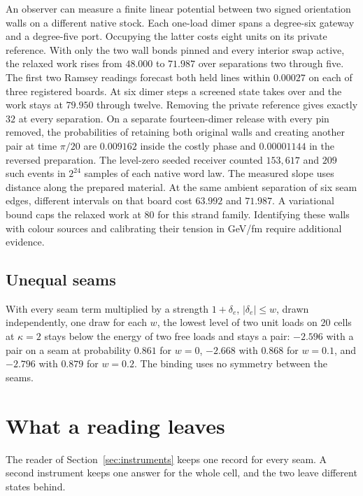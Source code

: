 \documentclass[11pt]{article}
\theoremstyle{definition}
\theoremstyle{remark}
\theoremstyle{plain}
\begin{document}
An observer can measure a finite linear potential between two signed
orientation walls on a different native stock. Each one-load dimer
spans a degree-six gateway and a degree-five port. Occupying the latter
costs eight units on its private reference. With only the two wall bonds
pinned and every interior swap active, the relaxed work rises from
$48.000$ to $71.987$ over separations two through five. The first two
Ramsey readings forecast both held lines within $0.00027$ on each of
three registered boards. At six dimer steps a screened state takes over
and the work stays at $79.950$ through twelve. Removing the private
reference gives exactly $32$ at every separation. On a separate
fourteen-dimer release with every pin removed, the probabilities of
retaining both original walls and creating another pair at time
$\pi/20$ are $0.009162$ inside the costly phase and $0.00001144$ in
the reversed preparation. The level-zero seeded receiver counted
$153{,}617$ and $209$ such events in $2^{24}$ samples of each native
word law. The measured slope uses distance along the prepared material.
At the same ambient separation of six seam edges, different intervals
on that board cost $63.992$ and $71.987$. A variational bound caps the
relaxed work at $80$ for this strand family. Identifying these walls
with colour sources and calibrating their tension in GeV/fm require
additional evidence.

\subsection{Unequal seams}

With every seam term multiplied by a strength $1+\delta_e$,
$\lvert\delta_e\rvert\le w$, drawn independently, one draw for each $w$,
the lowest level of two
unit loads on $20$ cells at $\kappa=2$ stays below the energy of two free
loads and stays a pair: $-2.596$ with a pair on a seam at probability
$0.861$ for $w=0$, $-2.668$ with $0.868$ for $w=0.1$, and $-2.796$ with
$0.879$ for $w=0.2$. The binding uses no symmetry between the seams.


\section{What a reading leaves}
\label{sec:presence}

The reader of Section~\ref{sec:instruments} keeps one record for every seam.
A second instrument keeps one answer for the whole cell, and the two leave
different states behind.
\end{document}
